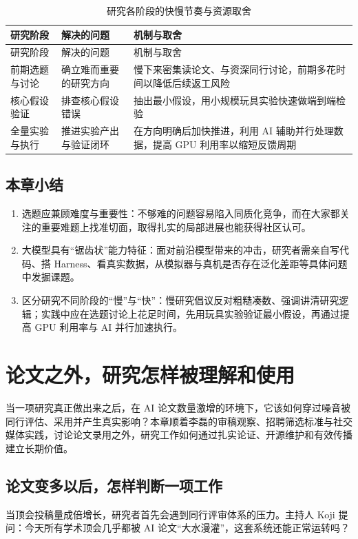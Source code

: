 \documentclass[UTF8,a4paper,11pt,fontset=fandol]{ctexart}
\begin{document}
\begingroup\small\setlength{\LTcapwidth}{\linewidth}
\begin{longtable}{>{\raggedright\arraybackslash}p{\dimexpr(\linewidth-6\tabcolsep)/3\relax}>{\raggedright\arraybackslash}p{\dimexpr(\linewidth-6\tabcolsep)/3\relax}>{\raggedright\arraybackslash}p{\dimexpr(\linewidth-6\tabcolsep)/3\relax}}
\caption{研究各阶段的快慢节奏与资源取舍}\\
\toprule
研究阶段 & 解决的问题 & 机制与取舍\\\midrule
\endfirsthead
\toprule
研究阶段 & 解决的问题 & 机制与取舍\\\midrule
\endhead
前期选题与讨论 & 确立难而重要的研究方向 & 慢下来密集读论文、与资深同行讨论，前期多花时间以降低后续返工风险\\[4pt]
核心假设验证 & 排查核心假设错误 & 抽出最小假设，用小规模玩具实验快速做端到端检验\\[4pt]
全量实验与执行 & 推进实验产出与验证闭环 & 在方向明确后加快推进，利用 AI 辅助并行处理数据，提高 GPU 利用率以缩短反馈周期\\[4pt]
\bottomrule\end{longtable}\endgroup
{}\subsection{本章小结}
\begin{enumerate}
\item 选题应兼顾难度与重要性：不够难的问题容易陷入同质化竞争，而在大家都关注的重要难题上找准切面，取得扎实的局部进展也能获得社区认可。
\item 大模型具有“锯齿状”能力特征：面对前沿模型带来的冲击，研究者需亲自写代码、搭 Harness、看真实数据，从模拟器与真机是否存在泛化差距等具体问题中发掘课题。
\item 区分研究不同阶段的“慢”与“快”：慢研究倡议反对粗糙凑数、强调讲清研究逻辑；实践中应在选题讨论上花足时间，先用玩具实验验证最小假设，再通过提高 GPU 利用率与 AI 并行加速执行。
\end{enumerate}
\section{论文之外，研究怎样被理解和使用}
当一项研究真正做出来之后，在 AI 论文数量激增的环境下，它该如何穿过噪音被同行评估、采用并产生真实影响？本章顺着李磊的审稿观察、招聘筛选标准与社交媒体实践，讨论论文录用之外，研究工作如何通过扎实论证、开源维护和有效传播建立长期价值。
\subsection{论文变多以后，怎样判断一项工作}
当顶会投稿量成倍增长，研究者首先会遇到同行评审体系的压力。主持人 Koji 提问：今天所有学术顶会几乎都被 AI 论文“大水漫灌”，这套系统还能正常运转吗？
\end{document}
